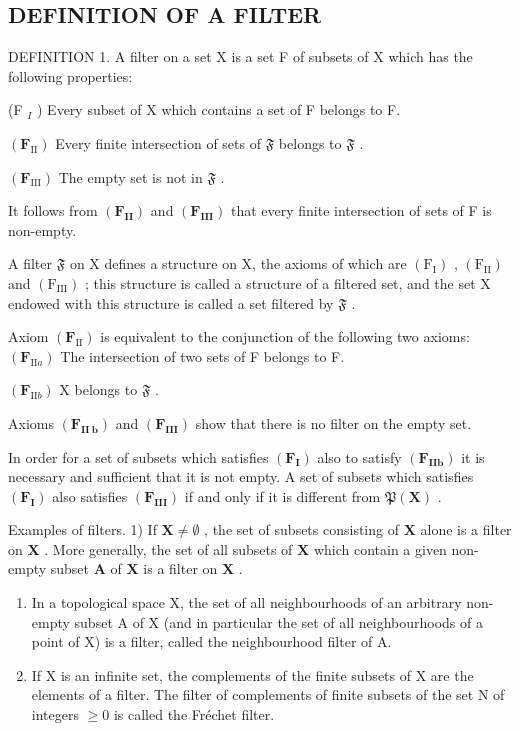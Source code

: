 \subsection{DEFINITION OF A FILTER}

DEFINITION 1. A filter on a set X is a set F of subsets of X which has the following properties:

(F \(_{I}\) ) Every subset of X which contains a set of F belongs to F.

\((\mathbf{F}_{\mathrm{II}})\) Every finite intersection of sets of \(\mathfrak{F}\) belongs to \(\mathfrak{F}\) .

\((\mathbf{F}_{\mathrm{III}})\) The empty set is not in \(\mathfrak{F}\) .

It follows from \((\mathbf{F}_{\mathbf{II}})\) and \((\mathbf{F}_{\mathbf{III}})\) that every finite intersection of sets of F is non-empty.

A filter \(\mathfrak{F}\) on X defines a structure on X, the axioms of which are \((\mathrm{F_I})\) , \((\mathrm{F_{II}})\) and \((\mathrm{F_{III}})\) ; this structure is called a structure of a filtered set, and the set X endowed with this structure is called a set filtered by \(\mathfrak{F}\) .

Axiom \((\mathbf{F}_{\mathrm{II}})\) is equivalent to the conjunction of the following two axioms: \((\mathbf{F}_{\mathrm{II}a})\) The intersection of two sets of F belongs to F.

\((\mathbf{F}_{\mathrm{II}b})\) X belongs to \(\mathfrak{F}\) .

Axioms \((\mathbf{F}_{\mathbf{II}\ \mathbf{b}})\) and \((\mathbf{F}_{\mathbf{III}})\) show that there is no filter on the empty set.

In order for a set of subsets which satisfies \((\mathbf{F}_{\mathbf{I}})\) also to satisfy \((\mathbf{F}_{\mathbf{II}\mathbf{b}})\) it is necessary and sufficient that it is not empty. A set of subsets which satisfies \((\mathbf{F}_{\mathbf{I}})\) also satisfies \((\mathbf{F}_{\mathbf{III}})\) if and only if it is different from \(\mathfrak{P}(\mathbf{X})\) .

Examples of filters. 1) If \(\mathbf{X} \neq \emptyset\) , the set of subsets consisting of \(\mathbf{X}\) alone is a filter on \(\mathbf{X}\) . More generally, the set of all subsets of \(\mathbf{X}\) which contain a given non-empty subset \(\mathbf{A}\) of \(\mathbf{X}\) is a filter on \(\mathbf{X}\) .

\begin{enumerate}
\def\labelenumi{\arabic{enumi})}
\setcounter{enumi}{1}
\item
  In a topological space X, the set of all neighbourhoods of an arbitrary non-empty subset A of X (and in particular the set of all neighbourhoods of a point of X) is a filter, called the neighbourhood filter of A.
\item
  If X is an infinite set, the complements of the finite subsets of X are the elements of a filter. The filter of complements of finite subsets of the set N of integers \(\geqslant0\) is called the Fréchet filter.
\end{enumerate}

